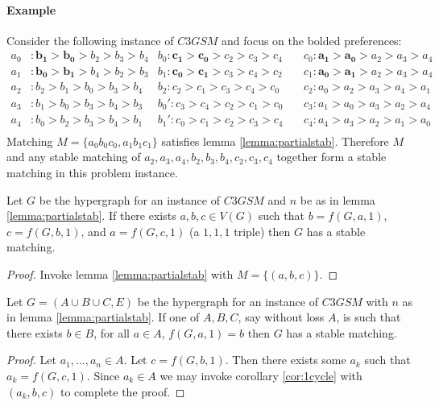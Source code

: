 \paragraph{Example}
Consider the following instance of $C3GSM$ and focus on the bolded preferences:
\begin{align*}
a_0 &: \boldsymbol{b_1} > \boldsymbol{b_0} > b_2 > b_3 > b_4    &b_0: \boldsymbol{c_1} > \boldsymbol{c_0}  > c_2 > c_3 > c_4   &\ &c_0:\boldsymbol{a_1} > \boldsymbol{a_0} > a_2 > a_3 > a_4\\
a_1 &: \boldsymbol{b_0} > \boldsymbol{b_1} > b_4 > b_2 > b_3    &b_1: \boldsymbol{c_0} > \boldsymbol{c_1}  > c_3 > c_4 > c_2  &\ &c_1:\boldsymbol{a_0} > \boldsymbol{a_1} > a_2 > a_3 > a_4\\
a_2 &: b_2 > b_1 > b_0 > b_3 > b_4    &b_2: c_2 > c_1 > c_3 > c_4 > c_0    &\ &c_2: a_0 > a_2 > a_3 > a_4 > a_1\\
a_3 &: b_1 > b_0 > b_3 > b_4 > b_3    &b_0': c_3 > c_4 > c_2 > c_1 > c_0   &\ &c_3:a_1 > a_0 > a_3 > a_2 > a_4 \\
a_4 &: b_0 > b_2 > b_3 > b_4 > b_1    &b_1': c_0 > c_1 > c_2 > c_3 > c_4   &\ &c_4:a_4 > a_3 > a_2 > a_1 > a_0\\
\end{align*}
Matching $M = \{a_0b_0c_0, a_1b_1c_1\}$ satisfies lemma \ref{lemma:partialstab}. Therefore $M$ and any stable matching of $a_2,a_3,a_4,b_2,b_3,b_4,c_2,c_3,c_4$ together form a stable matching in this problem instance.
\begin{corollary}\label{cor:1cycle}
Let $G$ be the hypergraph for an instance of $C3GSM$ and $n$ be as in lemma \ref{lemma:partialstab}. If there exists $a,b,c \in V(G)$ such that $b = f(G,a,1)$, $c = f(G,b,1)$, and $a = f(G,c,1)$ (a $1,1,1$ triple) then $G$ has a stable matching.
\end{corollary}
\begin{proof}
Invoke lemma \ref{lemma:partialstab} with $M = \{(a,b,c)\}$.
\end{proof}
\begin{corollary}
Let $G=(A\cup B \cup C, E)$ be the hypergraph for an instance of $C3GSM$ with $n$ as in lemma \ref{lemma:partialstab}. If one of $A,B,C$, say without loss $A$, is such that there exists $b \in B$, for all $a \in A$, $f(G,a,1) = b$ then $G$ has a stable matching.
\end{corollary}
\begin{proof}
Let $a_1, \dots, a_n \in A$. Let $c = f(G,b,1)$. Then there exists some $a_k$ such that $a_k = f(G,c,1)$. Since $a_k \in A$ we may invoke corollary \ref{cor:1cycle} with $(a_k, b, c)$ to complete the proof.
\end{proof}

